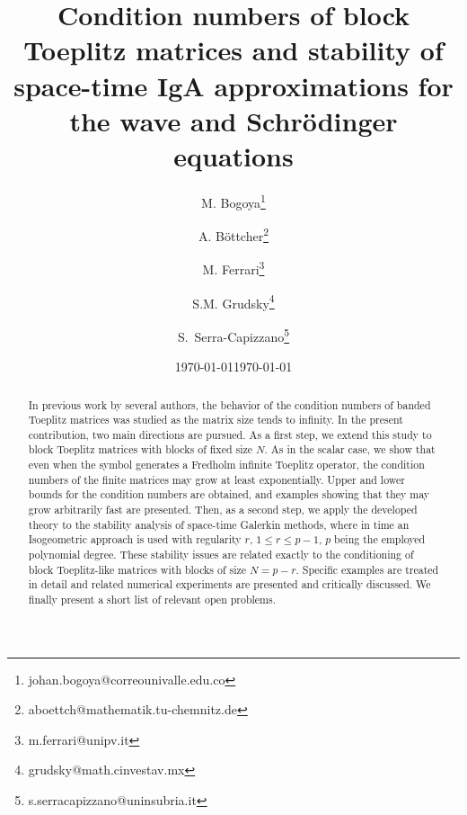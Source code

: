 \documentclass[addpoints,12pt,letter]{article}
\renewcommand{\le}{\leqslant}
\numberwithin{equation}{section}
\theoremstyle{definition}
\begin{document}
\title{Condition numbers of block Toeplitz matrices and stability of space-time IgA approximations for the wave and Schrödinger equations}
\date{\today}
\author[1]{M. Bogoya\thanks{johan.bogoya@correounivalle.edu.co}}
\author[2]{A. B\"ottcher\thanks{aboettch@mathematik.tu-chemnitz.de}}
\author[3]{M. Ferrari\thanks{m.ferrari@unipv.it}}
\author[4,5]{S.M. Grudsky\thanks{grudsky@math.cinvestav.mx}}
\author[6,7]{S.~Serra-Capizzano\thanks{s.serracapizzano@uninsubria.it}}

\date{\footnotesize\today}

\maketitle

\begin{abstract}
In previous work by several authors, the behavior of the condition numbers of banded Toeplitz  matrices was studied as the matrix size tends to infinity.
In the present contribution, two main directions are pursued.
As a first step, we extend this study to block Toeplitz matrices with blocks of fixed size $N$.
As in the scalar case, we show that even when the symbol generates a Fredholm infinite Toeplitz operator, the condition numbers of the finite matrices may grow at least exponentially.
Upper and lower bounds for the condition numbers are obtained, and examples showing that they may grow arbitrarily fast are presented.
Then, as a second step, we apply the developed theory to the stability analysis of space-time Galerkin methods, where in time an Isogeometric approach is used with regularity $r$, $1\le r\le p-1$, $p$ being the employed polynomial degree.
These stability issues are related exactly to the conditioning of block Toeplitz-like matrices with blocks of size $N=p-r$.
Specific examples are treated in detail and related numerical experiments are presented and critically discussed.
We finally present a short list of relevant open problems.
\end{abstract}
\end{document}
